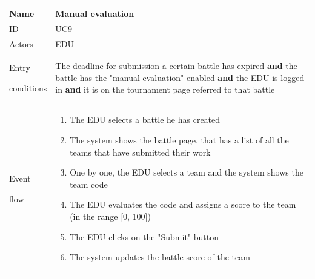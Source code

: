 \begin{center}
    \def\arraystretch{1.5}
    \begin{tabular}{| m{2cm} | m{10cm}|}
        \hline
        Name                  & Manual evaluation                                                                                                                                                                                                        \\ \hline
        ID                    & UC9                                                                                                                                                                                                                      \\ \hline
        Actors                & EDU                                                                                                                                                                                                                      \\ \hline
        Entry \par conditions & The deadline for submission a certain battle has expired \textbf{and} the battle has the "manual evaluation" enabled \textbf{and} the EDU is logged in \textbf{and} it is on the tournament page referred to that battle \\ \hline
        Event \par flow       & \begin{enumerate}
                                    \item The EDU selects a battle he has created
                                    \item The system shows the battle page, that has a list of all the teams that have submitted their work
                                    \item One by one, the EDU selects a team and the system shows the team code
                                    \item The EDU evaluates the code and assigns a score to the team (in the range [0, 100])
                                    \item The EDU clicks on the "Submit" button
                                    \item The system updates the battle score of the team
                                \end{enumerate}                                                                                                                   \\ \hline

\end{tabular}
\end{center}
